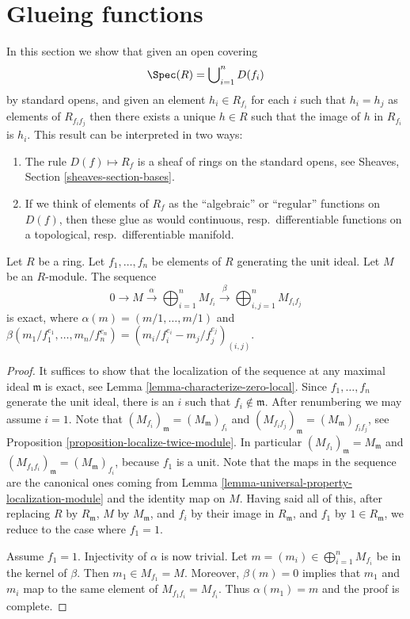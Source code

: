 \section{Glueing functions}
\label{section-tilde-module-sheaf}

\noindent
In this section we show that given an open covering
$$
\Spec(R) = \bigcup\nolimits_{i = 1}^n D(f_i)
$$
by standard opens, and given an element $h_i \in R_{f_i}$
for each $i$ such that $h_i = h_j$ as elements of $R_{f_i f_j}$
then there exists a unique $h \in R$ such that the image of
$h$ in $R_{f_i}$ is $h_i$. This result can be interpreted
in two ways:
\begin{enumerate}
\item The rule $D(f) \mapsto R_f$ is a sheaf of rings
on the standard opens, see Sheaves, Section \ref{sheaves-section-bases}.
\item If we think of elements of $R_f$ as the ``algebraic''
or ``regular'' functions on $D(f)$, then these glue
as would continuous, resp.\ differentiable functions
on a topological, resp.\ differentiable manifold.
\end{enumerate}

\begin{lemma}
\label{lemma-cover-module}
Let $R$ be a ring. Let $f_1, \ldots, f_n$ be elements of $R$
generating the unit ideal. Let $M$ be an $R$-module.
The sequence
$$
0 \to
M \xrightarrow{\alpha}
\bigoplus\nolimits_{i = 1}^n M_{f_i} \xrightarrow{\beta}
\bigoplus\nolimits_{i, j = 1}^n M_{f_i f_j}
$$
is exact, where $\alpha(m) = (m/1, \ldots, m/1)$
and $\beta(m_1/f_1^{e_1}, \ldots, m_n/f_n^{e_n})
= (m_i/f_i^{e_i} - m_j/f_j^{e_j})_{(i, j)}$.
\end{lemma}

\begin{proof}
It suffices to show that the localization of the sequence at
any maximal ideal $\mathfrak m$ is exact, see
Lemma \ref{lemma-characterize-zero-local}.
Since $f_1, \ldots, f_n$ generate the unit ideal,
there is an $i$ such that $f_i \not \in \mathfrak m$.
After renumbering we may assume $i = 1$.
Note that $(M_{f_i})_\mathfrak m = (M_\mathfrak m)_{f_i}$
and $(M_{f_if_j})_\mathfrak m = (M_\mathfrak m)_{f_if_j}$, see
Proposition \ref{proposition-localize-twice-module}.
In particular $(M_{f_1})_\mathfrak m = M_\mathfrak m$ and
$(M_{f_1 f_i})_\mathfrak m = (M_\mathfrak m)_{f_i}$, because
$f_1$ is a unit.
Note that the maps in the sequence are the canonical ones
coming from
Lemma \ref{lemma-universal-property-localization-module}
and the identity map on $M$.
Having said all of this, after replacing $R$ by $R_\mathfrak m$,
$M$ by $M_\mathfrak m$, and $f_i$ by their image in $R_\mathfrak m$,
and $f_1$ by $1 \in R_\mathfrak m$,
we reduce to the case where $f_1 = 1$.

\medskip\noindent
Assume $f_1 = 1$. Injectivity of $\alpha$ is now trivial. Let
$m = (m_i) \in \bigoplus_{i = 1}^n M_{f_i}$ be in the kernel of $\beta$.
Then $m_1 \in M_{f_1} = M$. Moreover, $\beta(m) = 0$
implies that $m_1$ and $m_i$ map to the same element of
$M_{f_1f_i} = M_{f_i}$. Thus $\alpha(m_1) = m$ and the
proof is complete.
\end{proof}

